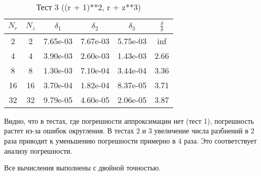 \begin{table}[H]
  \begin{center}
    \begin{tabular}{*{6}c}
      \toprule
      $ N_r $ & $ N_z $ & $ \delta_1 $ & $ \delta_2 $ & $ \delta_3 $ & $\frac{\delta}{\delta}$ \\
      \midrule
2&2&7.65e-03&7.67e-03&5.75e-03&inf\\
4&4&3.90e-03&2.60e-03&1.43e-03&2.66\\
8&8&1.30e-03&7.10e-04&3.44e-04&3.36\\
16&16&3.70e-04&1.82e-04&8.37e-05&3.71\\
32&32&9.79e-05&4.60e-05&2.06e-05&3.87\\
      \bottomrule
    \end{tabular}
    \caption{Тест 3 ((r + 1)**2, r + z**3)}
  \end{center}
\end{table}

Видно, что в тестах, где погрешности аппроксимации нет (тест 1), погрешность растет из-за ошибок округления. В тестах 2 и 3 увеличение числа разбиений в 2 раза приводит к уменьшению погрешности примерно в 4 раза.
Это соответствует анализу погрешности.

Все вычисления выполнены с двойной точностью.
